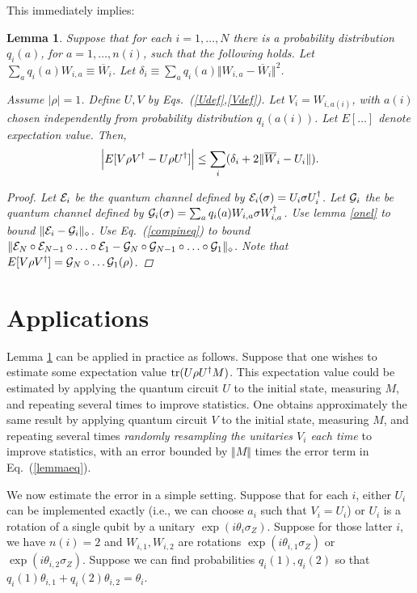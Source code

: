 \documentclass[aps,prl,amsmath,amssymb,amsfonts,superscriptaddress,floatfix]{revtex4}
\newtheorem{lemma}{Lemma}
\newcommand{\be}{\begin{equation}}
\newcommand{\ee}{\end{equation}}
\begin{document}
This immediately implies:
\begin{lemma}
\label{twol}
Suppose that for each $i=1,\ldots,N$ there is a probability distribution $q_i(a)$, for $a=1,\ldots,n(i)$, such that the following holds.
Let
$\sum_a q_i(a) W_{i,a} \equiv \overline W_i$.
Let
$\delta_i\equiv \sum_a q_i(a) \Vert W_{i,a}-\overline W_i \Vert^2$.

Assume $|\rho|=1$.  Define $U,V$ by Eqs.~(\ref{Udef},\ref{Vdef}).  Let $V_i=W_{i,a(i)}$, with $a(i)$ chosen  independently from probability distribution $q_i(a(i))$.
Let $E[\ldots]$ denote expectation value.
Then,
\be
\label{lemmaeq}
\Bigl| E[V \rho V^\dagger - U \rho U^\dagger] \Bigr| \leq
\sum_i (\delta_i
+ 2 \Vert \overline W_i - U_i \Vert) .
\ee

\begin{proof}
Let ${\cal E}_i$ be the quantum channel defined by ${\cal E}_i(\sigma)=U_i \sigma U_i^\dagger$.
Let ${\cal G}_i$ the be quantum channel defined by ${\cal G}_i(\sigma)=\sum_a q_i(a) W_{i,a} \sigma W_{i,a}^\dagger$.
Use lemma \ref{onel} to bound $\Vert {\cal E}_i-{\cal G}_i \Vert_\diamond$.
Use Eq.~(\ref{compineq}) to bound $\Vert{\cal E}_N\circ {\cal E}_{N-1} \circ \ldots \circ {\cal E}_1 - {\cal G}_N \circ {\cal G}_{N-1} \circ \ldots \circ {\cal G}_1\Vert_\diamond$.
Note that $E[V \rho V^\dagger] ={\cal G}_N \circ \ldots {\cal G}_1(\rho)$.
\end{proof}
\end{lemma}



\section{Applications}
Lemma \ref{twol} can be applied in practice as follows.  Suppose that one wishes to estimate some expectation
value ${\rm tr}(U\rho U^\dagger M)$.  This expectation value could be estimated by applying the quantum circuit $U$ to the initial state, measuring $M$, and repeating several times to improve statistics. One  obtains approximately the same result by applying quantum circuit $V$ to the initial state, measuring $M$, and repeating several times {\it randomly resampling the unitaries $V_i$ each time} to improve statistics, with an error bounded by $\Vert M \Vert$ times the error term in Eq.~(\ref{lemmaeq}).

We now estimate the error in a simple setting.  Suppose that for each $i$, either $U_i$ can be implemented exactly (i.e., we can choose $a_i$ such that $V_i=U_i$) or $U_i$ is a rotation of a single qubit by a unitary $\exp(i \theta_i \sigma_Z)$.
Suppose for those latter $i$, we have $n(i)=2$ and $W_{i,1},W_{i,2}$ are rotations $\exp(i \theta_{i,1} \sigma_Z)$ or $\exp(i \theta_{i,2} \sigma_Z)$.
Suppose we can find probabilities $q_i(1),q_i(2)$ so that
$q_i(1) \theta_{i,1}+q_i(2) \theta_{i,2}=\theta_i$.
\end{document}
